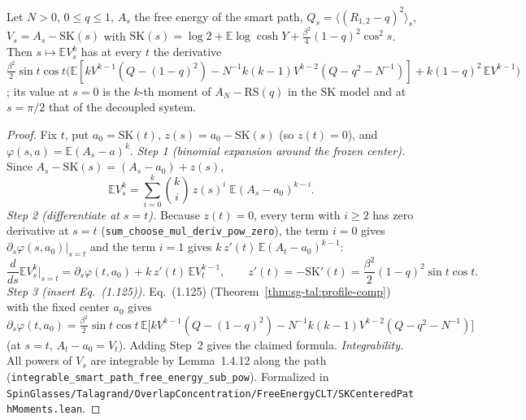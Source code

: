 \begin{theorem}\label{thm:sg-tal:centered-profile}
  \leanok
{}
Let $N>0$, $0\le q\le1$, $A_s$ the free energy of the smart path, $Q_s=\langle(R_{1,2}-q)^2\rangle_s$, $V_s=A_s-\mathrm{SK}(s)$ with $\mathrm{SK}(s)=\log 2+\mathbb E\log\cosh Y+\frac{\beta^2}4(1-q)^2\cos^2s$. Then $s\mapsto\mathbb E V_s^k$ has at every $t$ the derivative
$\frac{\beta^2}2\sin t\cos t\big(\mathbb E[kV^{k-1}(Q-(1-q)^2)-N^{-1}k(k-1)V^{k-2}(Q-q^2-N^{-1})]+k(1-q)^2\,\mathbb E V^{k-1}\big)$;
its value at $s=0$ is the $k$-th moment of $A_N-\mathrm{RS}(q)$ in the SK model and at $s=\pi/2$ that of the decoupled system.
\end{theorem}
\begin{proof}
  \leanok
Fix $t$, put $a_0=\mathrm{SK}(t)$, $z(s)=a_0-\mathrm{SK}(s)$ (so $z(t)=0$), and $\varphi(s,a)=\mathbb E(A_s-a)^k$.
\emph{Step 1 (binomial expansion around the frozen center).} Since $A_s-\mathrm{SK}(s)=(A_s-a_0)+z(s)$,
\[
\mathbb EV_s^k=\sum_{i=0}^k\binom ki\,z(s)^i\;\mathbb E(A_s-a_0)^{k-i}.
\]
\emph{Step 2 (differentiate at $s=t$).} Because $z(t)=0$, every term with $i\ge2$ has zero derivative at $s=t$ (\texttt{sum\_choose\_mul\_deriv\_pow\_zero}), the term $i=0$ gives $\partial_s\varphi(s,a_0)|_{s=t}$ and the term $i=1$ gives $k\,z'(t)\,\mathbb E(A_t-a_0)^{k-1}$:
\[
\frac d{ds}\mathbb EV_s^k\Big|_{s=t}=\partial_s\varphi(t,a_0)+k\,z'(t)\,\mathbb EV_t^{k-1},\qquad z'(t)=-\mathrm{SK}'(t)=\frac{\beta^2}2(1-q)^2\sin t\cos t .
\]
\emph{Step 3 (insert Eq.~(1.125)).} Eq.~(1.125) (Theorem~\ref{thm:sg-tal:profile-comp}) with the fixed center $a_0$ gives $\partial_s\varphi(t,a_0)=\frac{\beta^2}2\sin t\cos t\,\mathbb E\big[kV^{k-1}(Q-(1-q)^2)-N^{-1}k(k-1)V^{k-2}(Q-q^2-N^{-1})\big]$ (at $s=t$, $A_t-a_0=V_t$). Adding Step~2 gives the claimed formula.
\emph{Integrability.} All powers of $V_s$ are integrable by Lemma~1.4.12 along the path (\texttt{integrable\_smart\_path\_free\_energy\_sub\_pow}).
Formalized in \texttt{SpinGlasses/Talagrand/OverlapConcentration/FreeEnergyCLT/SKCenteredPathMoments.lean}.
\end{proof}

